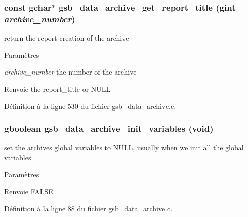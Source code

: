 \subsubsection[{gsb\_\-data\_\-archive\_\-get\_\-report\_\-title}]{\setlength{\rightskip}{0pt plus 5cm}const gchar$\ast$ gsb\_\-data\_\-archive\_\-get\_\-report\_\-title (gint {\em archive\_\-number})}\label{gsb__data__archive_8h_a3d8b5fb39ae27430a4ef69a8de23c016}
return the report creation of the archive


\begin{DoxyParams}{Paramètres}
\item[{\em archive\_\-number}]the number of the archive\end{DoxyParams}
\begin{DoxyReturn}{Renvoie}
the report\_\-title or NULL 
\end{DoxyReturn}


Définition à la ligne 530 du fichier gsb\_\-data\_\-archive.c.

\subsubsection[{gsb\_\-data\_\-archive\_\-init\_\-variables}]{\setlength{\rightskip}{0pt plus 5cm}gboolean gsb\_\-data\_\-archive\_\-init\_\-variables (void)}\label{gsb__data__archive_8h_a1167784bcdd0ebef214194f217a6db7e}
set the archives global variables to NULL, usually when we init all the global variables


\begin{DoxyParams}{Paramètres}
\item[{\em }]\end{DoxyParams}
\begin{DoxyReturn}{Renvoie}
FALSE 
\end{DoxyReturn}


Définition à la ligne 88 du fichier gsb\_\-data\_\-archive.c.

